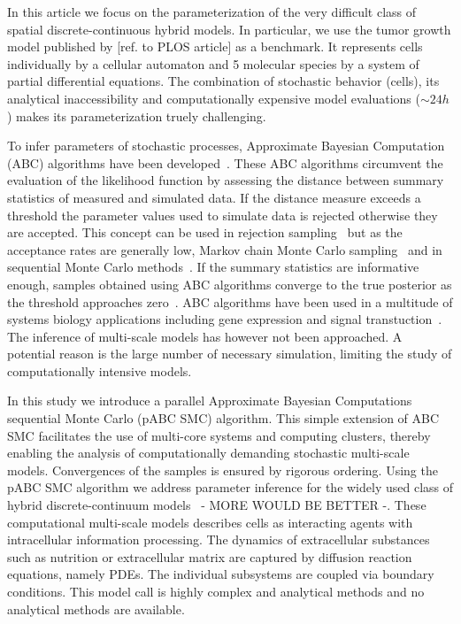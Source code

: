 \documentclass[10pt,letterpaper]{article}
\newcommand{\jh}[1]{{\color{red}#1}}
\begin{document}
In this article we focus on the parameterization of the very difficult class of spatial discrete-continuous hybrid models. In particular, we use the tumor growth model published by [ref. to PLOS article] as a benchmark. It represents cells individually by a cellular automaton and 5 molecular species by a system of partial differential equations. The combination of stochastic behavior (cells), its analytical inaccessibility and computationally expensive model evaluations ($\sim 24h$) makes its parameterization truely challenging.



To infer parameters of stochastic processes, Approximate Bayesian Computation (ABC) algorithms have been developed~\cite{BeaumontZha2002}. These ABC algorithms circumvent the evaluation of the likelihood function by assessing the distance between summary statistics of measured and simulated data. If the distance measure exceeds a threshold the parameter values used to simulate data is rejected otherwise they are accepted. This concept can be used in rejection sampling~\cite{BeaumontZha2002} but as the acceptance rates are generally low, Markov chain Monte Carlo sampling~\cite{MarjoramMol2003} and in sequential Monte Carlo methods~\cite{SissonFan2007}. If the summary statistics are informative enough, samples obtained using ABC algorithms converge to the true posterior as the threshold approaches zero~\cite{MarinPil2014}. ABC algorithms have been used in a multitude of systems biology applications including gene expression and signal transtuction~\cite{ToniWel2009,ToniJov2011,LillacciKha2013,LiepeFil2013,LoosMar2015}. The inference of multi-scale models has however not been approached. A potential reason is the large number of necessary simulation, limiting the study of computationally intensive models. 

In this study we introduce a parallel Approximate Bayesian Computations sequential Monte Carlo (pABC SMC) algorithm. This simple extension of ABC SMC facilitates the use of multi-core systems and computing clusters, thereby enabling the analysis of computationally demanding stochastic multi-scale models. Convergences of the samples is ensured by rigorous ordering. Using the pABC SMC algorithm we address parameter inference for the widely used class of hybrid discrete-continuum models~\cite{AndersonQua2008,HoehmeBru2010,Jagiella2012,Jagiella2015} \jh{- MORE WOULD BE BETTER -}. These computational multi-scale models describes cells as interacting agents with intracellular information processing. The dynamics of extracellular substances such as nutrition or extracellular matrix are captured by diffusion reaction equations, namely PDEs. The individual subsystems are coupled via boundary conditions. This model call is highly complex and analytical methods and no analytical methods are available.
\end{document}
